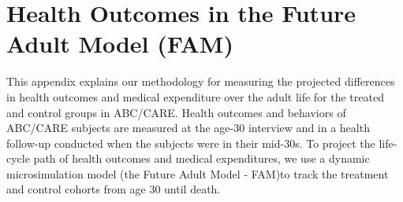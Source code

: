 \section{Health Outcomes in the Future Adult Model (FAM)} \label{appendix:health}

This appendix explains our methodology for measuring the projected differences in health outcomes and medical expenditure over the adult life for the treated and control groups in ABC/CARE.
Health outcomes and behaviors of ABC/CARE subjects are measured at the age-30 interview and in a health follow-up conducted when the subjects were in their mid-30s.
To project the life-cycle path of health outcomes and medical expenditures, we use a dynamic microsimulation model (the Future Adult Model - FAM)to track the treatment and control cohorts from age 30 until death.





%

